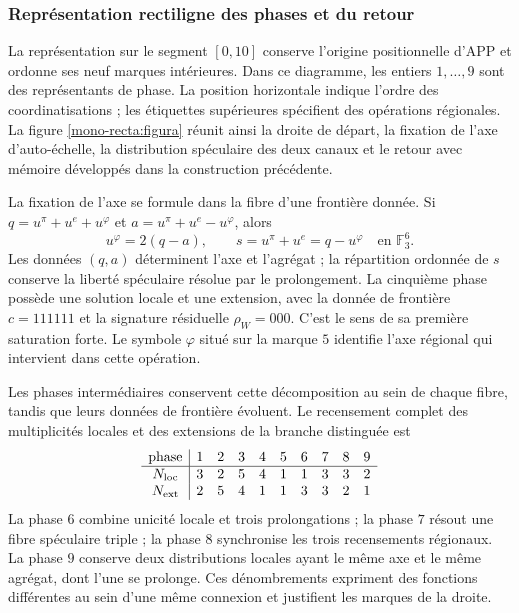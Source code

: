 \subsubsection{Représentation rectiligne des phases et du retour}
\label{mono-recta:desarrollo}

La représentation sur le segment \([0,10]\) conserve l'origine positionnelle d'APP et ordonne ses neuf marques intérieures. Dans ce diagramme, les entiers \(1,\ldots,9\) sont des représentants de phase. La position horizontale indique l'ordre des coordinatisations ; les étiquettes supérieures spécifient des opérations régionales. La figure \ref{mono-recta:figura} réunit ainsi la droite de départ, la fixation de l'axe d'auto-échelle, la distribution spéculaire des deux canaux et le retour avec mémoire développés dans la construction précédente.



La fixation de l'axe se formule dans la fibre d'une frontière donnée. Si
\(q=u^\pi+u^e+u^\varphi\) et
\(a=u^\pi+u^e-u^\varphi\), alors
\[
 u^\varphi=2(q-a),\qquad s=u^\pi+u^e=q-u^\varphi
 \quad\text{en }\mathbb F_3^6.
\]
Les données \((q,a)\) déterminent l'axe et l'agrégat ; la répartition ordonnée de \(s\) conserve la liberté spéculaire résolue par le prolongement. La cinquième phase possède une solution locale et une extension, avec la donnée de frontière \(c=111111\) et la signature résiduelle \(\rho_W=000\). C'est le sens de sa première saturation forte. Le symbole \(\varphi\) situé sur la marque \(5\) identifie l'axe régional qui intervient dans cette opération.

Les phases intermédiaires conservent cette décomposition au sein de chaque fibre,
tandis que leurs données de frontière évoluent. Le recensement complet des
multiplicités locales et des extensions de la branche distinguée est
\[
\begin{array}{c|rrrrrrrrr}
\text{phase}&1&2&3&4&5&6&7&8&9\\\hline
N_{\rm loc}&3&2&5&4&1&1&3&3&2\\
N_{\rm ext}&2&5&4&1&1&3&3&2&1
\end{array}
\]
La phase \(6\) combine unicité locale et trois prolongations ; la phase
\(7\) résout une fibre spéculaire triple ; la phase \(8\) synchronise
les trois recensements régionaux. La phase \(9\) conserve deux distributions
locales ayant le même axe et le même agrégat, dont l'une se
prolonge. Ces dénombrements expriment des fonctions différentes au sein d'une
même connexion et justifient les marques de la droite.

